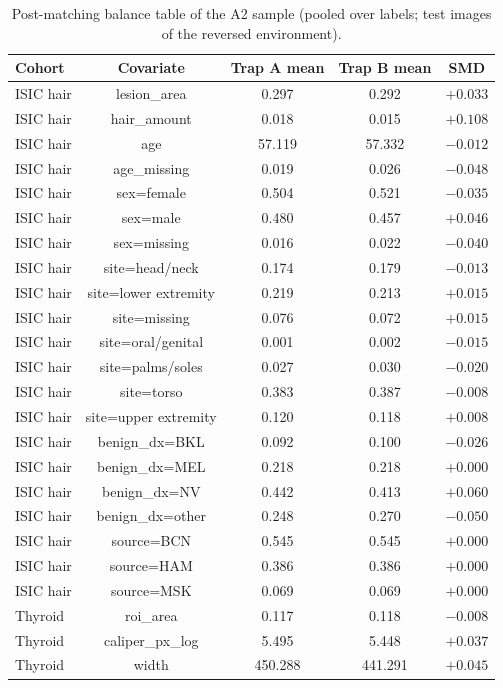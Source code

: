 \begin{table}[H]\centering\scriptsize
\caption{Post-matching balance table of the A2 sample (pooled over labels; test images of the reversed environment).}\label{tab:a2bal}
\begin{tabular}{lcccc}\toprule
Cohort & Covariate & Trap A mean & Trap B mean & SMD \\\midrule
ISIC hair & lesion\_area & 0.297 & 0.292 & $+0.033$ \\
ISIC hair & hair\_amount & 0.018 & 0.015 & $+0.108$ \\
ISIC hair & age & 57.119 & 57.332 & $-0.012$ \\
ISIC hair & age\_missing & 0.019 & 0.026 & $-0.048$ \\
ISIC hair & sex=female & 0.504 & 0.521 & $-0.035$ \\
ISIC hair & sex=male & 0.480 & 0.457 & $+0.046$ \\
ISIC hair & sex=missing & 0.016 & 0.022 & $-0.040$ \\
ISIC hair & site=head/neck & 0.174 & 0.179 & $-0.013$ \\
ISIC hair & site=lower extremity & 0.219 & 0.213 & $+0.015$ \\
ISIC hair & site=missing & 0.076 & 0.072 & $+0.015$ \\
ISIC hair & site=oral/genital & 0.001 & 0.002 & $-0.015$ \\
ISIC hair & site=palms/soles & 0.027 & 0.030 & $-0.020$ \\
ISIC hair & site=torso & 0.383 & 0.387 & $-0.008$ \\
ISIC hair & site=upper extremity & 0.120 & 0.118 & $+0.008$ \\
ISIC hair & benign\_dx=BKL & 0.092 & 0.100 & $-0.026$ \\
ISIC hair & benign\_dx=MEL & 0.218 & 0.218 & $+0.000$ \\
ISIC hair & benign\_dx=NV & 0.442 & 0.413 & $+0.060$ \\
ISIC hair & benign\_dx=other & 0.248 & 0.270 & $-0.050$ \\
ISIC hair & source=BCN & 0.545 & 0.545 & $+0.000$ \\
ISIC hair & source=HAM & 0.386 & 0.386 & $+0.000$ \\
ISIC hair & source=MSK & 0.069 & 0.069 & $+0.000$ \\
Thyroid & roi\_area & 0.117 & 0.118 & $-0.008$ \\
Thyroid & caliper\_px\_log & 5.495 & 5.448 & $+0.037$ \\
Thyroid & width & 450.288 & 441.291 & $+0.045$ \\

\end{tabular}
\end{table}
